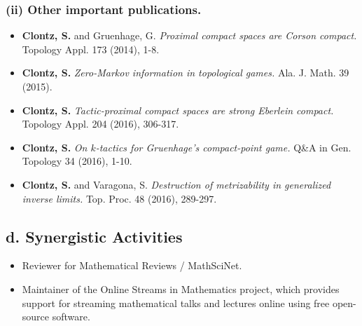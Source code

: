 \documentclass{article}
\begin{document}
\subsubsection*{(ii) Other important publications.}
\begin{itemize}

  \item \textbf{Clontz, S.} and Gruenhage, G.
    \textit{Proximal compact spaces are Corson compact.}
    Topology Appl. 173 (2014), 1-8.
  \item \textbf{Clontz, S.}
    \textit{Zero-Markov information in topological games.}
    Ala. J. Math. 39 (2015).
  \item \textbf{Clontz, S.}
    \textit{Tactic-proximal compact spaces are strong Eberlein compact.}
    Topology Appl. 204 (2016), 306-317.
  \item \textbf{Clontz, S.}
    \textit{On \(k\)-tactics for Gruenhage's compact-point game.}
    Q\&A in Gen. Topology 34 (2016), 1-10.
  \item \textbf{Clontz, S.} and Varagona, S.
    \textit{Destruction of metrizability in generalized inverse limits.}
    Top. Proc. 48 (2016), 289-297.


\end{itemize}

\subsection*{d. Synergistic Activities}

\begin{itemize}%

  \item Reviewer for Mathematical Reviews / MathSciNet.
  \item Maintainer of the Online Streams in Mathematics project, which
  provides support for streaming mathematical talks and lectures online
  using free open-source software.




\end{itemize}
\end{document}

